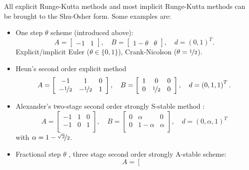 \documentclass[a4paper,12pt]{article}
\begin{document}
All explicit Runge-Kutta methods and most implicit Runge-Kutta methods
can be brought to the Shu-Osher form.
Some examples are:
\begin{itemize}
\item One step $\theta$ scheme (introduced above):
\begin{equation*}
A = \left[\begin{array}{cc}
-1 & 1
\end{array}\right],
\quad B = \left[\begin{array}{cc}
1-\theta & \theta
\end{array}\right],
\quad d = \left(
0, 1
\right)^T.
\end{equation*}
Explicit/implicit Euler ($\theta\in\{0,1\}$), Crank-Nicolson ($\theta=\nicefrac12$).
\item Heun's second order explicit method
\begin{equation*}
A = \left[\begin{array}{ccc}
-1 & 1 & 0\\
-\nicefrac12 & -\nicefrac12 & 1\\
\end{array}\right],
\quad B = \left[\begin{array}{ccc}
1 & 0 & 0\\
0 & \nicefrac12 & 0\\
\end{array}\right],
\quad d = \left(
0, 1, 1
\right)^T.
\end{equation*}
\item Alexander's two-stage second order strongly S-stable method \cite{alexander:77}:
\begin{equation*}
A = \left[\begin{array}{ccc}
-1 & 1 & 0\\
-1 & 0 & 1\\
\end{array}\right],
\quad B = \left[\begin{array}{ccc}
0 & \alpha     & 0\\
0 & 1-\alpha & \alpha\\
\end{array}\right],
\quad d = \left(
0, \alpha, 1
\right)^T
\end{equation*}
with $\alpha=1-\nicefrac{\sqrt{2}}{2}$.
\item Fractional step $\theta$ \cite{Meidner201545}, three stage second order strongly A-stable scheme:
\begin{equation*}
A = \left[\begin{array}{rrrr}

\end{array}
\end{equation*}
\end{itemize}
\end{document}
